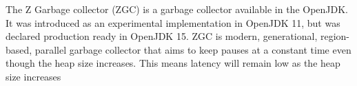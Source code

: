 The Z Garbage collector (ZGC) is a garbage collector available in the OpenJDK. It was introduced as an experimental implementation in OpenJDK 11, but was declared production ready in OpenJDK 15. ZGC is modern, generational, region-based, parallel garbage collector that aims to keep pauses at a constant time even though the heap size increases. This means latency will remain low as the heap size increases%

